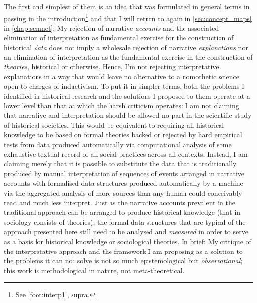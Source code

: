 The first and simplest of them is an idea that was formulated in general terms in passing in the introduction\footnote{
    See \autoref{foot:interp1}, supra.
} and that I will return to again in \autoref{sec:concept_maps} in \autoref{chap:semnet}:
My rejection of narrative \emph{accounts} and the associated elimination of interpretation as fundamental exercise for the construction of historical \emph{data} does not imply a wholesale rejection of narrative \emph{explanations} nor an elimination of interpretation as the fundamental exercise in the construction of \emph{theories}, historical or otherwise.
Hence, I'm not rejecting interpretative explanations in a way that would leave no alternative to a nomothetic science open to charges of inductivism.
To put it in simpler terms, both the problems I identified in historical research and the solutions I proposed to them operate at a lower level than that at which the harsh criticism operates:
I am not claiming that narrative and interpretation should be allowed no part in the scientific study of historical societies.
This would be equivalent to requiring all historical knowledge to be based on formal theories backed or rejected by hard empirical tests from data produced automatically via computational analysis of some exhaustive textual record of all social practices across all contexts.
Instead, I am claiming merely that it is possible to substitute the data that is traditionally produced by manual interpretation of sequences of events arranged in narrative accounts with formalised data structures produced automatically by a machine via the aggregated analysis of more sources than any human could conceivably read and much less interpret.
Just as the narrative accounts prevalent in the traditional approach can be arranged to produce historical knowledge (that in sociology consists of theories), the formal data structures that are typical of the approach presented here still need to be analysed and \emph{measured} in order to serve as a basis for historical knowledge or sociological theories.
In brief: My critique of the interpretative approach and the framework I am proposing as a solution to the problems it can not solve is not so much epistemological but \emph{observational}; this work is methodological in nature, not meta-theoretical.

